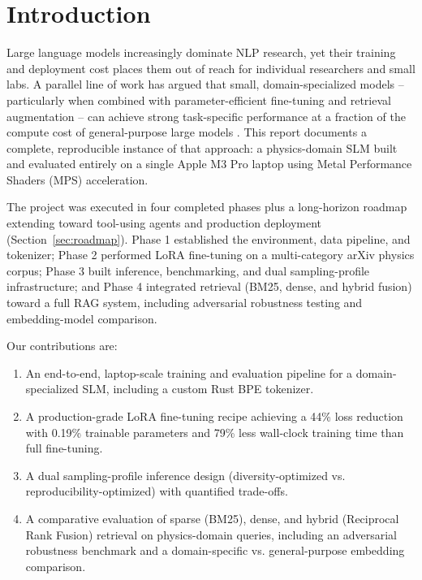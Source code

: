 \documentclass[11pt]{article}
\begin{document}
\section{Introduction}
Large language models increasingly dominate NLP research, yet their training
and deployment cost places them out of reach for individual researchers and
small labs. A parallel line of work has argued that small, domain-specialized
models -- particularly when combined with parameter-efficient fine-tuning and
retrieval augmentation -- can achieve strong task-specific performance at a
fraction of the compute cost of general-purpose large models
\cite{jhandi2025slm,kang2026enterprise,sharma2025survey,elfeki2025encoder,patience2025ibm,sacai2025edge,industrial2025datacentric,linkedin2025ranking}.
This report documents a complete, reproducible instance of that approach:
a physics-domain SLM built and evaluated entirely on a single Apple M3 Pro
laptop using Metal Performance Shaders (MPS) acceleration.

The project was executed in four completed phases plus a long-horizon
roadmap extending toward tool-using agents and production deployment
(Section~\ref{sec:roadmap}). Phase 1 established the environment, data
pipeline, and tokenizer; Phase 2 performed LoRA fine-tuning on a
multi-category arXiv physics corpus; Phase 3 built inference, benchmarking,
and dual sampling-profile infrastructure; and Phase 4 integrated retrieval
(BM25, dense, and hybrid fusion) toward a full RAG system, including
adversarial robustness testing and embedding-model comparison.

Our contributions are:
\begin{enumerate}[nosep]
    \item An end-to-end, laptop-scale training and evaluation pipeline for
          a domain-specialized SLM, including a custom Rust BPE tokenizer.
    \item A production-grade LoRA fine-tuning recipe achieving a 44\% loss
          reduction with 0.19\% trainable parameters and 79\% less wall-clock
          training time than full fine-tuning.
    \item A dual sampling-profile inference design (diversity-optimized vs.
          reproducibility-optimized) with quantified trade-offs.
    \item A comparative evaluation of sparse (BM25), dense, and hybrid
          (Reciprocal Rank Fusion) retrieval on physics-domain queries,
          including an adversarial robustness benchmark and a
          domain-specific vs. general-purpose embedding comparison.
\end{enumerate}
\end{document}
